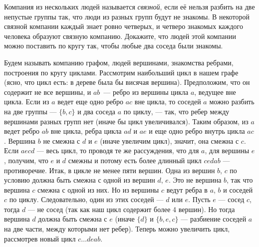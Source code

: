 Компания из нескольких людей называется \emph{связной}, если её нельзя разбить
на две непустые группы так, что люди из разных групп будут не знакомы.
В некоторой связной компании каждый знает ровно четверых, и четверо знакомых
каждого человека образуют связную компанию.
Докажите, что людей этой компании можно поставить по кругу так, чтобы любые два
соседа были знакомы.

\solution
Будем называть компанию графом, людей вершинами, знакомства ребрами, построения
по кругу циклами.
Рассмотрим наибольший цикл в нашем графе
(ясно, что цикл есть: в дереве была бы висячая вершина).
Предположим, что он содержит не все вершины, и $ab$~--- ребро из вершины цикла
$a$, ведущее вне цикла.
Если из $a$ ведет еще одно ребро $ac$ вне цикла, то соседей $a$ можно разбить
на две группы --- $\{b, c\}$ и два соседа $a$ по циклу, --- так, что ребер
между вершинами разных групп нет (иначе бы цикл увеличивался).
Таким образом, из $a$ ведет ребро $ab$ вне цикла, ребра цикла $ad$ и $ae$ и еще
одно ребро внутрь цикла $ac$.
Вершина $b$ не смежна с $d$ и $e$ (иначе увеличим цикл), значит, она смежна с
$c$.
Если $aecd$ --- весь цикл, то проводя те же рассуждения, что для $a$, для
вершины $e$, получим, что $e$ и $d$ смежны и потому есть более длинный цикл
$cedab$ --- противоречие.
Итак, в цикле не менее пяти вершин.
Одна из вершин $b$, $c$ по условию должна быть смежна с одной из вершин
$d$, $e$.
Это не вершина $b$, так что вершина $c$ смежна с одной из них.
Но из вершины $c$ ведут ребра в $a$, $b$ и соседей $c$ по циклу.
Следовательно, один из этих соседей --- $d$ или $e$.
Пусть $e$ --- сосед $c$, тогда $d$ --- не сосед
(так как наш цикл содержит более 4 вершин).
Но тогда вершина $d$ должна быть смежна с $e$ (иначе $\{d\}$ и $\{b,e,c\}$ --- разбиение соседей $a$ на две части, между которыми нет ребер).
Теперь можно увеличить цикл, рассмотрев новый цикл $c \ldots deab$. 

